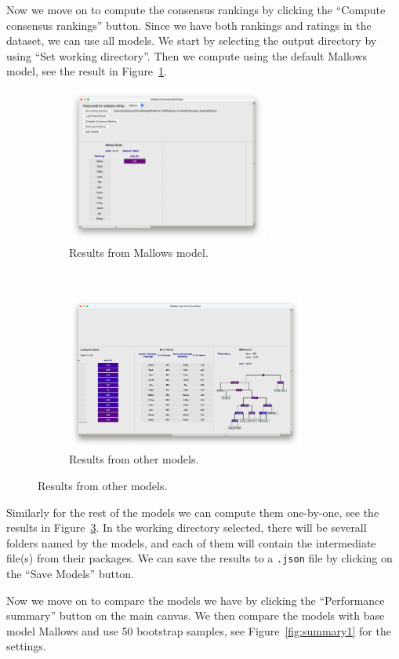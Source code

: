 \documentclass[a4paper,11pt]{memoir}
\begin{document}
Now we move on to compute the consensus rankings by clicking the ``Compute consensus rankings'' button. 
Since we have both rankings and ratings in the dataset,
we can use all models. We start by selecting the output directory
by using ``Set working directory''.
Then we compute using the default Mallows model, see the result in Figure~\ref{fig:example3}.

  \begin{figure}[h]
    \centering
    \begin{subfigure}[t]{0.5\textwidth}
        \centering
        \includegraphics[height=2in]{art/mallows.png}
        \caption{Results from Mallows model.}\label{fig:example3}
    \end{subfigure}%
    ~ 
    \begin{subfigure}[t]{0.5\textwidth}
        \centering
      \includegraphics[height=2in]{art/all_models.png}
      \caption{Results from other models.}\label{fig:example4}
    \end{subfigure}
  \end{figure}


Similarly for the rest of the models we can compute them one-by-one, 
see the results in Figure~\ref{fig:example4}.
In the working directory selected, there will be severall folders named by the models,
and each of them will contain the intermediate file(s) from their packages.
We can save the results to a \texttt{.json} file by clicking on the ``Save Models'' button.

Now we move on to compare the models we have
by clicking the ``Performance summary'' button on the main canvas.
We then compare the models with base model Mallows and use
50 bootstrap samples,
see Figure~\ref{fig:summary1} for the settings.
\end{document}
